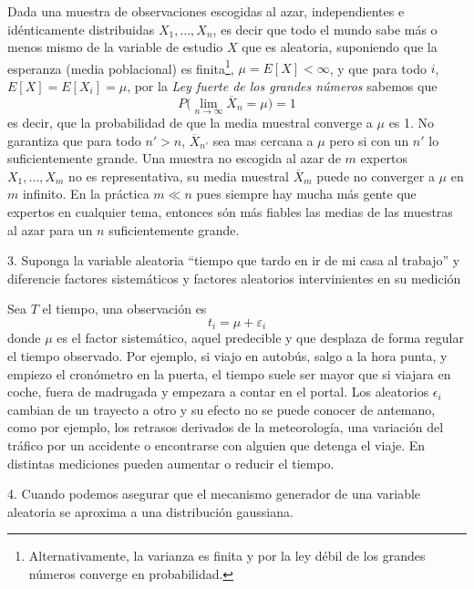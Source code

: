 \documentclass[11pt,a4paper]{article}
\begin{document}
Dada una muestra de observaciones escogidas al azar, independientes e idénticamente distribuidas $X_1,\dots,X_n$, es decir que todo el mundo sabe más o menos mismo de la variable de estudio $X$ que es aleatoria, suponiendo que la esperanza (media poblacional) es finita\footnote{Alternativamente, la varianza es finita y por la ley débil de los grandes números converge en probabilidad.}, $\mu = E[X] < \infty$, y que para todo $i$, $E[X] = E[X_i] = \mu$, por la \textit{Ley fuerte de los grandes números} sabemos que 
\[
P\Big(\lim_{n\rightarrow \infty} \overline{X}_n = \mu\Big) = 1
\]
es decir, que la probabilidad de que la media muestral converge a $\mu$ es 1. No garantiza que para todo $n'>n$, $\overline{X}_{n'}$ sea mas cercana a $\mu$ pero si con un $n'$ lo suficientemente grande. Una muestra no escogida al azar de $m$ expertos $X_1, \dots, X_m$ no es representativa, su media muestral $\overline{X}_m$ puede no converger a $\mu$ en $m$ infinito. En la práctica $m \ll n$ pues siempre hay mucha más gente que expertos en cualquier tema, entonces són más fiables las medias de las muestras al azar para un $n$ suficientemente grande.
\newpage
\begin{tcolorbox}[colback=gray!20,colframe=gray!20, sharp corners]
3. Suponga la variable aleatoria “tiempo que tardo en ir de mi casa al trabajo” y diferencie factores sistemáticos y factores aleatorios intervinientes en su medición
\end{tcolorbox}
Sea $T$ el tiempo, una observación es
\begin{equation*}
    t_i = \mu + \varepsilon_i
\end{equation*}
donde $\mu$ es el factor sistemático, aquel predecible y que desplaza de forma regular el tiempo observado. Por ejemplo, si viajo en autobús, salgo a la hora punta, y empiezo el cronómetro en la puerta, el tiempo suele ser mayor que si viajara en coche, fuera de madrugada y empezara a contar en el portal.
Los aleatorios $\epsilon_i$ cambian de un trayecto a otro y su efecto no se puede conocer de antemano, como por ejemplo, los retrasos derivados de la meteorología, una variación del tráfico por un accidente o encontrarse con alguien que detenga el viaje. En distintas mediciones pueden aumentar o reducir el tiempo.

\begin{tcolorbox}[colback=gray!20,colframe=gray!20, sharp corners]
4. Cuando podemos asegurar que el mecanismo generador de una variable aleatoria se aproxima a una distribución gaussiana.
\end{tcolorbox}
\end{document}
